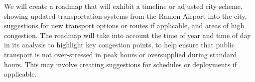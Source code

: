 \documentclass[12pt]{article}                         %
\begin{document}
We will create a roadmap that will exhibit a timeline or adjusted city scheme, showing updated transportation systems from the Ramon Airport into the city, suggestions for new transport options or routes if applicable, and areas of high congestion. The roadmap will take into account the time of year and time of day in its analysis to highlight key congestion points, to help ensure that public transport is not over-stressed in peak hours or oversupplied during standard hours. This may involve creating suggestions for schedules or deployments if applicable.

\newpage


\end{document}
